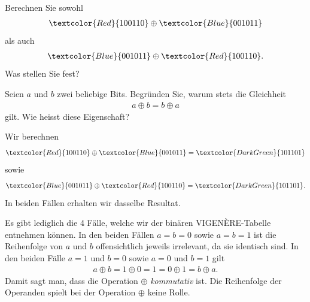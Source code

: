\begin{myexercise}
	\begin{aenum}
		\item Berechnen Sie sowohl
		\begin{align*}
			\textcolor{Red}{100110}\oplus \textcolor{Blue}{001011}
		\end{align*}
		als auch
		\begin{align*}
			\textcolor{Blue}{001011}\oplus \textcolor{Red}{100110}.
		\end{align*}
		Was stellen Sie fest?
		\item Seien $a$ und $b$ zwei beliebige Bits. Begründen Sie, warum stets die Gleichheit
		\begin{align*}
			a\oplus b = b\oplus a
		\end{align*}
		gilt. Wie heisst diese Eigenschaft?
	\end{aenum}
	\begin{myanswer}
		\begin{aenum}
			\item Wir berechnen
			\begin{align*}
				\textcolor{Red}{100110}\oplus \textcolor{Blue}{001011} = \textcolor{DarkGreen}{101101}
			\end{align*}
			sowie
			\begin{align*}
				\textcolor{Blue}{001011}\oplus \textcolor{Red}{100110} = \textcolor{DarkGreen}{101101}.
			\end{align*}
			In beiden Fällen erhalten wir dasselbe Resultat.
			\item Es gibt lediglich die 4 Fälle, welche wir der binären VIGENÈRE-Tabelle entnehmen können. In den beiden Fällen $a = b = 0$ sowie $a = b = 1$ ist die Reihenfolge von $a$ und $b$ offensichtlich jeweils irrelevant, da sie identisch sind. In den beiden Fälle $a = 1$ und $b = 0$ sowie $a = 0$ und $b =1$ gilt
			\begin{align*}
				a\oplus b = 1\oplus 0 = 1 = 0\oplus 1 = b\oplus a.
			\end{align*}
			Damit sagt man, dass die Operation $\oplus$ \textit{kommutativ} ist. Die Reihenfolge der Operanden spielt bei der Operation $\oplus$ keine Rolle.
		\end{aenum}
	\end{myanswer}
\end{myexercise}

